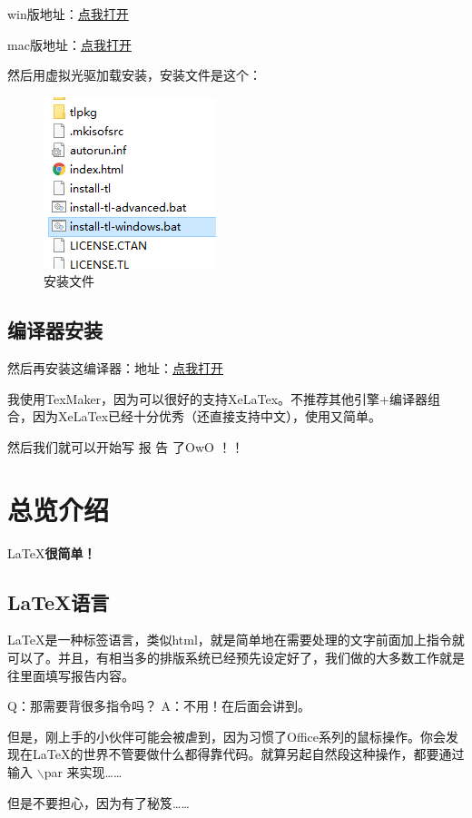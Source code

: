 \documentclass[12pt,a4paper,oneside]{book}
\begin{document}
win版地址：\href{http://pan.baidu.com/share/link?uk=705221041&shareid=72337831&third=0&adapt=pc&from=wapforcetoweb}{点我打开}

mac版地址：\href{http://pan.baidu.com/share/link?uk=2064390295&shareid=584901926&third=0&adapt=pc&fr=ftw}{点我打开}


\par

然后用虚拟光驱加载安装，安装文件是这个：
\par

\begin{figure}[htp] 
\centering 
\includegraphics[scale=0.75]{tl.png}
\caption{安装文件}%
\label{pic:tl}
\end{figure}
\vspace{2em}

\section{编译器安装}
\par
然后再安装这编译器：地址：\href{http://www.xm1math.net/texmaker/download.html}{点我打开}

\par
我使用TexMaker，因为可以很好的支持XeLaTex。不推荐其他引擎+编译器组合，因为XeLaTex已经十分优秀（还直接支持中文），使用又简单。
\par
然后我们就可以开始写 报 告 了OwO ！！
\chapter{总览介绍}
\begin{center}
\LaTeX {\bfseries {很简单！}}
\end{center}
\vspace{2em}
\section{LaTeX语言}
\LaTeX 是一种{\color{cyan}标签语言}，类似html，就是简单地在需要处理的文字前面加上指令就可以了。并且，有相当多的排版系统已经预先设定好了，我们做的大多数工作就是往里面填写报告内容。
\par
Q：那需要背很多指令吗？ A：{\color{cyan}不用}！在后面会讲到。
\par
但是，刚上手的小伙伴可能会被虐到，因为习惯了Office系列的鼠标操作。你会发现在\LaTeX 的世界不管要做什么都得靠{\color{cyan}代码}。就算另起自然段这种操作，都要通过输入 $\backslash$par 来实现……
\par
但是不要担心，因为有了秘笈……
\end{document}

